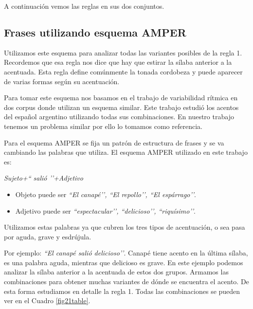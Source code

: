 A continuación vemos las reglas en sus dos conjuntos.

\subsection{Frases utilizando esquema AMPER}


Utilizamos este esquema para analizar todas las variantes posibles de la regla 1. Recordemos que esa regla nos dice que hay que estirar la sílaba anterior a la acentuada. Esta regla define comúnmente la tonada cordobeza y puede aparecer de varias formas según su acentuación. 

Para tomar este esquema nos basamos en el trabajo de variabilidad rítmica en dos corpus \cite{amper} donde utilizan un esquema similar. Este trabajo estudió los acentos del español argentino utilizando todas sus combinaciones. En nuestro trabajo tenemos un problema similar por ello lo tomamos como referencia.

Para el esquema AMPER se fija un patrón de estructura de frases y se va cambiando las palabras que utiliza. 
El esquema AMPER utilizado en este trabajo es: 
\begin{center}
\textit{Sujeto+`` salió ’’+Adjetivo} 
\end{center}

\begin{itemize}
	\item Objeto puede ser \textit{``El canapé’’, ``El repollo’’, ``El espárrago’’}.
	\item Adjetivo puede ser \textit{``espectacular’’, ``delicioso’’, ``riquísimo’’}.
\end{itemize}

Utilizamos estas palabras ya que cubren los tres tipos de acentuación, o sea pasa por aguda, grave y esdrújula. 

Por ejemplo: \textit{``El canapé salió delicioso’’}. Canapé tiene acento en la última sílaba, es una palabra aguda, mientras que delicioso es grave. En este ejemplo podemos analizar la sílaba anterior a la acentuada de estos dos grupos. Armamos las combinaciones para obtener muchas variantes de dónde se encuentra el acento. De esta forma estudiamos en detalle la regla 1. Todas las combinaciones se pueden ver en el Cuadro \ref{fig21table}.

